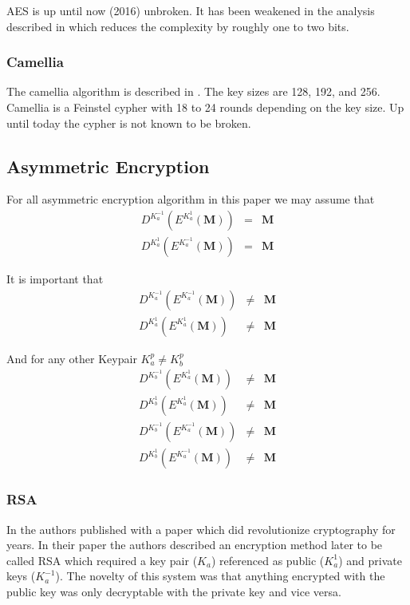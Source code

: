 AES is up until now (2016) unbroken. It has been weakened in the analysis described in \cite{tao2015improving} which reduces the complexity by roughly one to two bits. 

\subsubsection{Camellia}
The camellia algorithm is described in \cite{RFC3713}. The key sizes are 128, 192, and 256. Camellia is a Feinstel cypher with 18 to 24 rounds depending on the key size. Up until today the cypher is not known to be broken. 

\subsection{Asymmetric Encryption}
For all asymmetric encryption algorithm in this paper we may assume that 
\begin{eqnarray}
	D^{K^{-1}_a}\left(E^{K^{1}_a}\left(\mathbf{M}\right)\right) & = & \mathbf{M}\\
	D^{K^{1}_a}\left(E^{K^{-1}_a}\left(\mathbf{M}\right)\right) & = & \mathbf{M}
\end{eqnarray} 

It is important that 
\begin{eqnarray}
	D^{K^{-1}_a}\left(E^{K^{-1}_a}\left(\mathbf{M}\right)\right) & \neq & \mathbf{M}\\
	D^{K^{1}_a}\left(E^{K^{1}_a}\left(\mathbf{M}\right)\right)   & \neq & \mathbf{M}
\end{eqnarray} 

And for any other Keypair $K^{p}_a \neq K^{p}_b$
\begin{eqnarray}
	D^{K^{-1}_b}\left(E^{K^{1}_a}\left(\mathbf{M}\right)\right)  & \neq & \mathbf{M}\\
	D^{K^{1}_b}\left(E^{K^{1}_a}\left(\mathbf{M}\right)\right)   & \neq & \mathbf{M}\\
	D^{K^{-1}_b}\left(E^{K^{-1}_a}\left(\mathbf{M}\right)\right) & \neq & \mathbf{M}\\
	D^{K^{1}_b}\left(E^{K^{-1}_a}\left(\mathbf{M}\right)\right)  & \neq & \mathbf{M}
\end{eqnarray} 

\subsubsection{RSA}
In \citeyear{Rivest:1978:MOD:359340.359342} the authors \citeauthor{Rivest:1978:MOD:359340.359342} published with \cite{Rivest:1978:MOD:359340.359342} a paper which did revolutionize cryptography for years. In their paper the authors described an encryption method later to be called RSA which required a key pair ($K_a$) referenced as public ($K^{1}_a$) and private keys ($K^{-1}_a$). The novelty of this system was that anything encrypted with the public key was only decryptable with the private key and vice versa.

